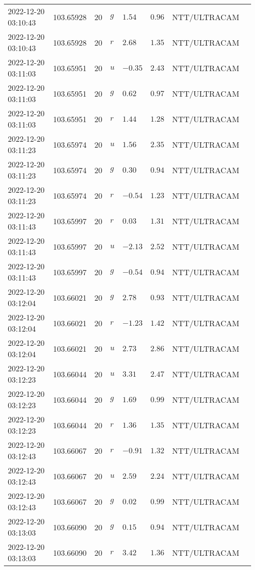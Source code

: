 \documentclass{nature_plusfigure}
\begin{document}
\begin{supplement}
\begin{center}
\begin{longtable}{llllllll}
2022-12-20 03:10:43 & 103.65928 & 20 & $g$ & $1.54$ & $0.96$ & NTT/ULTRACAM &  \\ 
2022-12-20 03:10:43 & 103.65928 & 20 & $r$ & $2.68$ & $1.35$ & NTT/ULTRACAM &  \\ 
2022-12-20 03:11:03 & 103.65951 & 20 & $u$ & $-0.35$ & $2.43$ & NTT/ULTRACAM &  \\ 
2022-12-20 03:11:03 & 103.65951 & 20 & $g$ & $0.62$ & $0.97$ & NTT/ULTRACAM &  \\ 
2022-12-20 03:11:03 & 103.65951 & 20 & $r$ & $1.44$ & $1.28$ & NTT/ULTRACAM &  \\ 
2022-12-20 03:11:23 & 103.65974 & 20 & $u$ & $1.56$ & $2.35$ & NTT/ULTRACAM &  \\ 
2022-12-20 03:11:23 & 103.65974 & 20 & $g$ & $0.30$ & $0.94$ & NTT/ULTRACAM &  \\ 
2022-12-20 03:11:23 & 103.65974 & 20 & $r$ & $-0.54$ & $1.23$ & NTT/ULTRACAM &  \\ 
2022-12-20 03:11:43 & 103.65997 & 20 & $r$ & $0.03$ & $1.31$ & NTT/ULTRACAM &  \\ 
2022-12-20 03:11:43 & 103.65997 & 20 & $u$ & $-2.13$ & $2.52$ & NTT/ULTRACAM &  \\ 
2022-12-20 03:11:43 & 103.65997 & 20 & $g$ & $-0.54$ & $0.94$ & NTT/ULTRACAM &  \\ 
2022-12-20 03:12:04 & 103.66021 & 20 & $g$ & $2.78$ & $0.93$ & NTT/ULTRACAM &  \\ 
2022-12-20 03:12:04 & 103.66021 & 20 & $r$ & $-1.23$ & $1.42$ & NTT/ULTRACAM &  \\ 
2022-12-20 03:12:04 & 103.66021 & 20 & $u$ & $2.73$ & $2.86$ & NTT/ULTRACAM &  \\ 
2022-12-20 03:12:23 & 103.66044 & 20 & $u$ & $3.31$ & $2.47$ & NTT/ULTRACAM &  \\ 
2022-12-20 03:12:23 & 103.66044 & 20 & $g$ & $1.69$ & $0.99$ & NTT/ULTRACAM &  \\ 
2022-12-20 03:12:23 & 103.66044 & 20 & $r$ & $1.36$ & $1.35$ & NTT/ULTRACAM &  \\ 
2022-12-20 03:12:43 & 103.66067 & 20 & $r$ & $-0.91$ & $1.32$ & NTT/ULTRACAM &  \\ 
2022-12-20 03:12:43 & 103.66067 & 20 & $u$ & $2.59$ & $2.24$ & NTT/ULTRACAM &  \\ 
2022-12-20 03:12:43 & 103.66067 & 20 & $g$ & $0.02$ & $0.99$ & NTT/ULTRACAM &  \\ 
2022-12-20 03:13:03 & 103.66090 & 20 & $g$ & $0.15$ & $0.94$ & NTT/ULTRACAM &  \\ 
2022-12-20 03:13:03 & 103.66090 & 20 & $r$ & $3.42$ & $1.36$ & NTT/ULTRACAM &  \\ 

\end{longtable}
\end{center}
\end{supplement}
\end{document}
